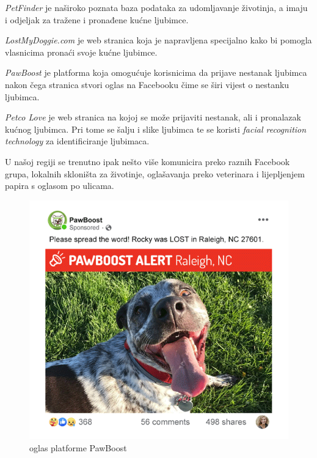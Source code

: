 		\begin{packed_item}		
		
			\item \textit{PetFinder} je naširoko poznata baza podataka za udomljavanje životinja, a imaju i odjeljak za tražene i pronađene kućne ljubimce.
		
			\item \textit{LostMyDoggie.com} je web stranica koja je napravljena specijalno kako bi pomogla vlasnicima pronaći svoje kućne ljubimce.
		
			\item \textit{PawBoost} je platforma koja omogućuje korisnicima da prijave nestanak ljubimca nakon čega stranica stvori oglas na Facebooku čime se širi vijest o nestanku ljubimca.
		
			\item \textit{Petco Love} je web stranica na kojoj se može prijaviti nestanak, ali i pronalazak kućnog ljubimca. Pri tome se šalju i slike ljubimca te se koristi \textit{facial recognition technology} za identificiranje ljubimaca.
		
		\end{packed_item}
		
		U našoj regiji se trenutno ipak nešto više komunicira preko raznih Facebook grupa, lokalnih skloništa za životinje, oglašavanja preko veterinara i lijepljenjem papira s oglasom po ulicama.\\
		
		\begin{figure}[H]
			\includegraphics[scale=0.5]{slike/pawBoost.PNG} 
			\centering
			\caption{oglas platforme PawBoost}
			\label{pawBoost}
		\end{figure}
		
